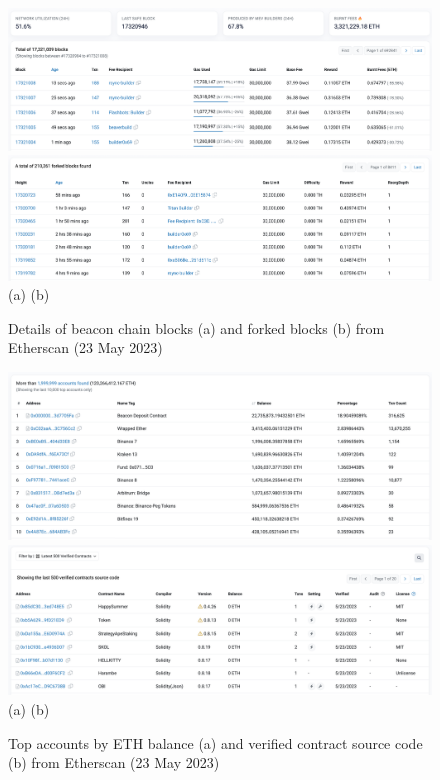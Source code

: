 \documentclass[UTF8]{article}
\begin{document}
\begin{figure}[htbp]
\begin{center}
\includegraphics[width=0.48\linewidth]{images/blocks}
\includegraphics[width=0.48\linewidth]{images/forked} \\
(a)\hspace{160pt}        (b)\\
\caption{Details of beacon chain blocks (a) and forked blocks (b) from Etherscan (23 May 2023)}
\label{fig:blocks}
\end{center}
\end{figure}

\begin{figure}[htbp]
\begin{center}
\includegraphics[width=0.48\linewidth]{images/accounts}
\includegraphics[width=0.48\linewidth]{images/contracts} \\
(a)\hspace{160pt}        (b)\\
\caption{Top accounts by ETH balance (a) and verified contract source code (b) from Etherscan (23 May 2023)}
\label{fig:accounts}
\end{center}
\end{figure}
\end{document}
